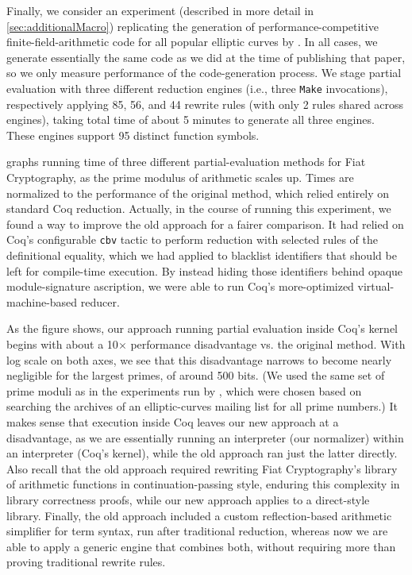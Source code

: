 Finally, we consider an experiment (described in more detail in \autoref{sec:additionalMacro}) replicating the generation of performance-competitive finite-field-arithmetic code for all popular elliptic curves by \textcite{FiatCryptoSP19}.
In all cases, we generate essentially the same code as we did at the time of publishing that paper, so we only measure performance of the code-generation process.
We stage partial evaluation with three different reduction engines (i.e., three \texttt{Make} invocations), respectively applying 85, 56, and 44 rewrite rules (with only 2 rules shared across engines), taking total time of about 5 minutes to generate all three engines.
These engines support 95 distinct function symbols.

\egroup

 graphs running time of three different partial-evaluation methods for Fiat Cryptography, as the prime modulus of arithmetic scales up.
Times are normalized to the performance of the original method, which relied entirely on standard Coq reduction.
Actually, in the course of running this experiment, we found a way to improve the old approach for a fairer comparison.
It had relied on Coq's configurable \texttt{cbv} tactic to perform reduction with selected rules of the definitional equality, which we had applied to blacklist identifiers that should be left for compile-time execution.
By instead hiding those identifiers behind opaque module-signature ascription, we were able to run Coq's more-optimized virtual-machine-based reducer.

As the figure shows, our approach running partial evaluation inside Coq's kernel begins with about a 10$\times$ performance disadvantage {vs.} the original method.
With log scale on both axes, we see that this disadvantage narrows to become nearly negligible for the largest primes, of around 500 bits.
(We used the same set of prime moduli as in the experiments run by \textcite{FiatCryptoSP19}, which were chosen based on searching the archives of an elliptic-curves mailing list for all prime numbers.)
It makes sense that execution inside Coq leaves our new approach at a disadvantage, as we are essentially running an interpreter (our normalizer) within an interpreter (Coq's kernel), while the old approach ran just the latter directly.
Also recall that the old approach required rewriting Fiat Cryptography's library of arithmetic functions in continuation-passing style, enduring this complexity in library correctness proofs, while our new approach applies to a direct-style library.
Finally, the old approach included a custom reflection-based arithmetic simplifier for term syntax, run after traditional reduction, whereas now we are able to apply a generic engine that combines both, without requiring more than proving traditional rewrite rules.

